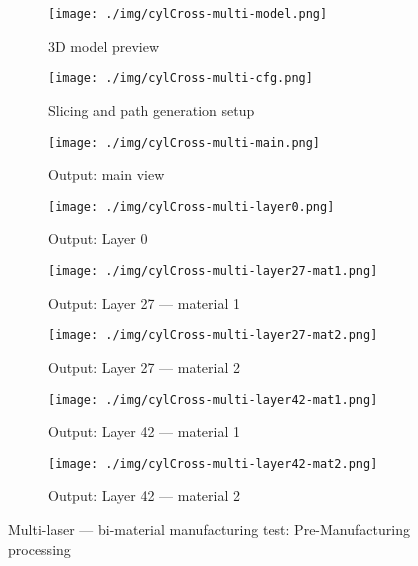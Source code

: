 \begin{figure}[htbp!]
  \centering
  \begin{subfigure}[t]{0.48\textwidth}
  \centering
  \texttt{[image: ./img/cylCross-multi-model.png]}
  \caption{3D model preview}%
  \label{fig:cylCross-multi-model}
  \end{subfigure}
%
  \begin{subfigure}[t]{0.48\textwidth}
  \centering
  \texttt{[image: ./img/cylCross-multi-cfg.png]}
  \caption{Slicing and path generation setup}%
  \label{fig:cylCross-multi-cfg}
\end{subfigure}
%
  \begin{subfigure}[t]{0.48\textwidth}
  \centering
  \texttt{[image: ./img/cylCross-multi-main.png]}
  \caption{Output: main view}%
  \label{fig:cylCross-multi-main}
\end{subfigure}
%
  \begin{subfigure}[t]{0.48\textwidth}
  \centering
  \texttt{[image: ./img/cylCross-multi-layer0.png]}
  \caption{Output: Layer 0}%
  \label{fig:cylCross-multi-layer0}
\end{subfigure}
%
  \begin{subfigure}[t]{0.48\textwidth}
  \centering
  \texttt{[image: ./img/cylCross-multi-layer27-mat1.png]}
  \caption{Output: Layer 27 --- material 1}%
  \label{fig:cylCross-multi-layer27-mat1}
\end{subfigure}
%
%
  \begin{subfigure}[t]{0.48\textwidth}
  \centering
  \texttt{[image: ./img/cylCross-multi-layer27-mat2.png]}
  \caption{Output: Layer 27 --- material 2}%
  \label{fig:cylCross-multi-layer27-mat2}
\end{subfigure}
%
  \begin{subfigure}[t]{0.48\textwidth}
  \centering
  \texttt{[image: ./img/cylCross-multi-layer42-mat1.png]}
  \caption{Output: Layer 42 --- material 1}%
  \label{fig:cylCross-multi-layer42-mat1}
\end{subfigure}
%
  \begin{subfigure}[t]{0.48\textwidth}
  \centering
  \texttt{[image: ./img/cylCross-multi-layer42-mat2.png]}
  \caption{Output: Layer 42 --- material 2}%
  \label{fig:cylCross-multi-layer42-mat2}
\end{subfigure}
  \caption{Multi-laser --- bi-material manufacturing test: Pre-Manufacturing
  processing}%
  \label{fig:cylCross-multi-test}
\end{figure}


